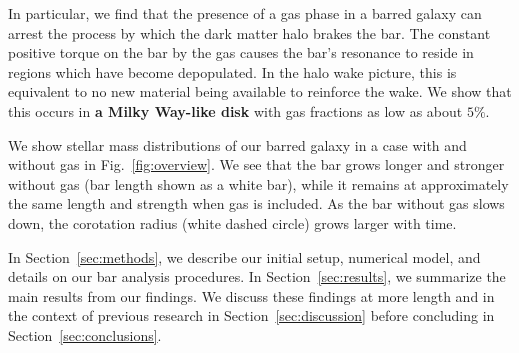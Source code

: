 \documentclass[twocolumn,linenumbers,trackchanges]{aastex631}
\newcommand{\RCR}{\ensuremath{R_{\textrm{CR}}}}
\newcommand{\Rot}{\ensuremath{\mathcal{R}}}
\begin{document}
In particular, we find that the presence of a gas phase in a barred
galaxy can arrest the process by which the dark matter halo brakes the bar. The
constant positive torque on the bar by the gas causes the bar's resonance to
reside in regions which have become depopulated. In the halo wake picture, this
is equivalent to no new material being available to reinforce the wake. We show
that this occurs in {\bf a Milky Way-like disk} with gas fractions as low as
about $5\%$.

We show stellar mass distributions of our barred galaxy in a case with and
without gas in Fig.~\ref{fig:overview}. We see that the bar grows longer and
stronger without gas (bar length shown as a white bar), while it remains
at approximately the same length and strength when gas is included. As the
bar without gas slows down, the corotation radius (white dashed circle) grows
larger with time.


In Section~\ref{sec:methods}, we describe our initial setup, numerical model,
and details on our bar analysis procedures. In Section~\ref{sec:results}, we
summarize the main results from our findings. We discuss these findings at more
length and in the context of previous research in Section~\ref{sec:discussion}
before concluding in Section~\ref{sec:conclusions}.

\end{document}
